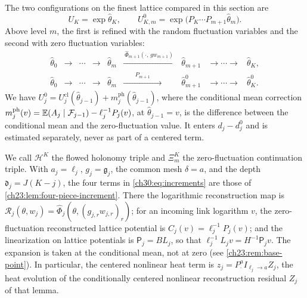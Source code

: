 The two configurations on the finest lattice compared in this section are
\[
 U_K=\exp\widehat\theta_K,\qquad U_{K,m}^0=\exp\bigl(P_K\cdots P_{m+1}\widehat\theta_m\bigr).
\]
Above level $m$, the first is refined with the random fluctuation variables and the second with zero fluctuation variables:
\[
\begin{array}{ccccccccc}
 \widehat\theta_0&\to&\cdots&\to&\widehat\theta_m&\xrightarrow{\ \widehat\Phi_{m+1}(\cdot,\,g w_{m+1})\ }&\widehat\theta_{m+1}&\to\cdots\to&\widehat\theta_K,\\[2pt]
 \widehat\theta_0&\to&\cdots&\to&\widehat\theta_m&\xrightarrow{\qquad P_{m+1}\qquad}&\widehat\theta^0_{m+1}&\to\cdots\to&\widehat\theta^0_K.
\end{array}
\]
We have $U_j^0=U_j^{\mathrm{cl}}(\widehat\theta_{j-1})+m_j^{\mathrm{ph}}(\widehat\theta_{j-1})$, where the conditional mean correction $m_j^{\mathrm{ph}}(v)=\mathbb E(A_j\mid\mathcal F_{j-1})-\ell_j^{-1}P_j(v)$, at $\widehat\theta_{j-1}=v$, is the difference between the conditional mean and the zero-fluctuation value. It enters $d_j-d_j^0$ and is estimated separately, never as part of a centered term.

We call $\mathcal H^K$ the flowed holonomy triple and $\Xi_m^K$ the zero-fluctuation continuation triple. With $a_j=\ell_j$, $g_j=\mathfrak g_j$, the common mesh $\delta=a$, and the depth $\mathfrak d_j=J(K-j)$, the four terms in \eqref{ch30:eq:increments} are those of \cref{ch23:lem:four-piece-increment}. There the logarithmic reconstruction map is $\mathscr R_j(\theta,w_j)=\widehat\Phi_j(\theta,(g_{j,r}w_{j,r})_r)$; for an incoming link logarithm $v$, the zero-fluctuation reconstructed lattice potential is $C_j(v)=\ell_j^{-1}P_j(v)$; and the linearization on lattice potentials is $\mathsf P_j=BL_j$, so that $\ell_j^{-1}L_jv=H^{-1}\mathsf P_jv$. The expansion is taken at the conditional mean, not at zero (see \cref{ch23:rem:base-point}). In particular, the centered nonlinear heat term is $z_j=P_\cdot^aI_{\ell_j\to a}Z_j$, the heat evolution of the conditionally centered nonlinear reconstruction residual $Z_j$ of that lemma.

